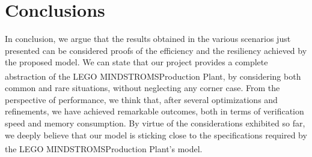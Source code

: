 \documentclass[a4paper,twoside]{article}
\begin{document}
    \section{C\lowercase{onclusions}}

    In conclusion, we argue that the results obtained in the various scenarios just presented can be considered proofs of the efficiency and the resiliency achieved by the proposed model. We can state that our project provides a complete abstraction of the LEGO\textsuperscript{\textregistered} MINDSTROMS\texttrademark Production Plant, by considering both common and rare situations, without neglecting any corner case. From the perspective of performance, we think that, after several optimizations and refinements, we have achieved remarkable outcomes, both in terms of verification speed and memory consumption. By virtue of the considerations exhibited so far, we deeply believe that our model is sticking close to the specifications required by the LEGO\textsuperscript{\textregistered} MINDSTROMS\texttrademark Production Plant's model.
\end{document}
